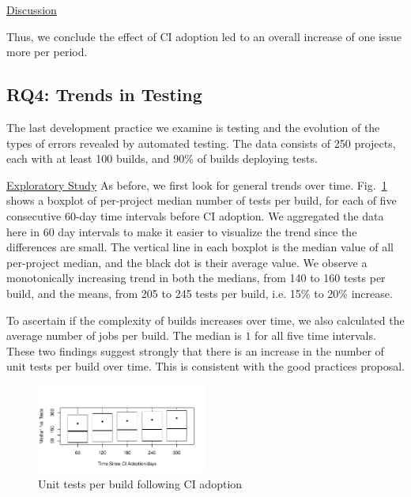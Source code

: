 \noindent \underline{Discussion}

 Thus, we conclude the effect of CI adoption led to an overall increase of one issue more per period.




\subsection{RQ4: Trends in Testing}

The last development practice we examine is testing and the evolution of the types of errors revealed by automated testing.
The data consists of 250 projects, each with at least 100 builds, and 90\% of builds deploying tests.

\noindent \underline{Exploratory Study} As before, we first look for general trends over time.
Fig.~\ref{Fig:Tests} shows a boxplot of per-project median number of tests per build, for each of five consecutive 60-day time intervals before CI adoption.
We aggregated the data here in 60 day intervals to make it easier to visualize the trend since the differences are small.
The vertical line in each boxplot is the median value of all per-project median, and the black dot is their average value.
We observe a monotonically increasing trend in both the medians, from 140 to 160 tests per build, and the means, from 205 to 245 tests per build, i.e. 15\% to 20\% increase. 

To ascertain if the complexity of builds increases over time, we also calculated the average number of jobs per build.
The median is $1$ for all five time intervals.
These two findings suggest strongly that there is an increase in the number of unit tests per build over time.
This is consistent with the good practices proposal.


\begin{figure}[!t]
\centering
\includegraphics[width=0.5\textwidth]{tests.pdf}
\caption{Unit tests per build following CI adoption}
\label{Fig:Tests}
\end{figure}

